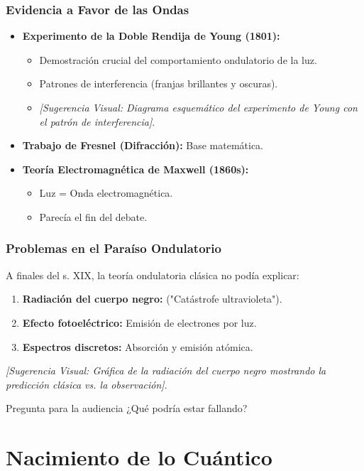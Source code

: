 \documentclass{beamer}
\begin{document}
	\begin{frame}
		\frametitle{Evidencia a Favor de las Ondas}
		\begin{itemize}
			\item \textbf{Experimento de la Doble Rendija de Young (1801):}
			\begin{itemize}
				\item Demostración crucial del comportamiento ondulatorio de la luz.
				\item Patrones de interferencia (franjas brillantes y oscuras).
				\item \textit{[Sugerencia Visual: Diagrama esquemático del experimento de Young con el patrón de interferencia]}.
			\end{itemize} \pause
			\item \textbf{Trabajo de Fresnel (Difracción):} Base matemática. \pause
			\item \textbf{Teoría Electromagnética de Maxwell (1860s):}
			\begin{itemize}
				\item Luz = Onda electromagnética.
				\item Parecía el fin del debate.
			\end{itemize}
		\end{itemize}
	\end{frame}
	
	\begin{frame}
		\frametitle{Problemas en el Paraíso Ondulatorio}
		A finales del s. XIX, la teoría ondulatoria clásica no podía explicar:
		\begin{enumerate}
			\item \textbf{Radiación del cuerpo negro:} ("Catástrofe ultravioleta"). \pause
			\item \textbf{Efecto fotoeléctrico:} Emisión de electrones por luz. \pause
			\item \textbf{Espectros discretos:} Absorción y emisión atómica.
		\end{enumerate}
		\pause
		\textit{[Sugerencia Visual: Gráfica de la radiación del cuerpo negro mostrando la predicción clásica vs. la observación]}.
		\pause
		\begin{alertblock}{Pregunta para la audiencia}
			¿Qué podría estar fallando?
		\end{alertblock}
	\end{frame}
	
	\section{Nacimiento de lo Cuántico}
	
\end{document}
